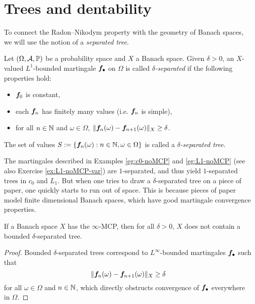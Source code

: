 \section{Trees and dentability}

To connect the Radon--Nikodym property with the geometry of Banach spaces, we will use the notion of a \emph{separated tree}.

\begin{defn}
  Let $(\Omega,\mathcal{A},\mathbb{P})$ be a probability space and $X$ a Banach space.
  Given $\delta > 0$, an $X$-valued $L^1$-bounded martingale $\bm{f}_\bullet$ on $\Omega$ is called \emph{$\delta$-separated} if the following properties hold:
  \begin{itemize}
  \item $\bm{f}_0$ is constant,
  \item each $\bm{f}_n$ has finitely many values (i.e. $\bm{f}_{n}$ is simple),
  \item for all $n \in \mathbb{N}$ and $\omega \in \Omega$, $\|\bm{f}_n(\omega) - \bm{f}_{n+1}(\omega)\|_X \geq \delta$.
  \end{itemize}
  The set of values $S := \{\bm{f}_n(\omega) : n \in \mathbb{N}, \omega \in \Omega\}$ is called a \emph{$\delta$-separated tree}.  
\end{defn}

The martingales described in Examples \ref{eg:c0-noMCP} and \ref{eg:L1-noMCP} (see also Exercise \ref{ex:L1-noMCP-var}) are $1$-separated, and thus yield $1$-separated trees in $c_0$ and $L_1$.
But when one tries to draw a $\delta$-separated tree on a piece of paper, one quickly starts to run out of space.
This is because pieces of paper model finite dimensional Banach spaces, which have good martingale convergence properties.

\begin{prop} 
  If a Banach space $X$ has the $\infty$-MCP, then for all $\delta > 0$, $X$ does not contain a bounded $\delta$-separated tree.
\end{prop}

\begin{proof}
  Bounded $\delta$-separated trees correspond to $L^\infty$-bounded martingales $\bm{f}_{\bullet}$ such that
  \begin{equation*}
    \|\bm{f}_n(\omega) - \bm{f}_{n+1}(\omega)\|_{X} \geq \delta
  \end{equation*}
  for all $\omega \in \Omega$ and $n \in \mathbb{N}$,
  which directly obstructs convergence of $\bm{f}_\bullet$ everywhere in $\Omega$.
\end{proof}

